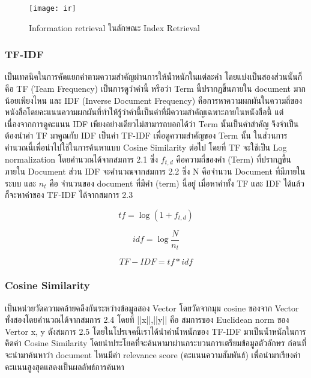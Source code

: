     \begin{figure}[H]
        \centering
        \texttt{[image: ir]}
        \caption{Information retrieval ในลักษณะ Index Retrieval}\label{fig:ir}
    \end{figure}

\subsubsection{TF-IDF}

เป็นเทคนิคในการคัดแยกคำตามความสำคัญผ่านการให้น้ำหนักในแต่ละคำ โดยแบ่งเป็นสองส่วนนั้นก็คือ TF (Team Frequency) เป็นการดูว่าคำนี้ หรือว่า Term นี้ปรากฏขึ้นภายใน document มากน้อยเพียงไหน และ IDF (Inverse  Document Frequency) คือการหาความผกผันในความถี่ของหนังสือโดยคะแนนความผกผันที่ทำให้รู้ว่าคำนี้เป็นคำที่มีความสำคัญเฉพาะภายในหนังสือนี้ แต่เนื่องจากการดูคะแนน IDF เพียงอย่างเดียวไม่สามารถบอกได้ว่า Term นั้นเป็นคำสำคัญ จึงจำเป็นต้องนำค่า TF มาคูณกับ IDF เป็นค่า TF-IDF เพื่อดูความสำคัญของ Term นั้น ในส่วนการคำนวณนี้เพื่อนำไปใช้ในการค้นหาแบบ Cosine Similarity ต่อไป โดยที่ TF จะใช้เป็น Log normalization โดยคำนวณได้จากสมการ 2.1 ซึ่ง $f_{t,d}$ คือความถี่ของคำ (Term) ที่ปรากฏขึ้นภายใน Document ส่วน IDF จะคำนวณจากสมการ 2.2 ซึ่ง N คือจำนวน Document ที่มีภายในระบบ และ $n_{t}$ คือ จำนวนของ document ที่มีคำ (term) นี้อยู่ เมื่อหาค่าทั้ง TF และ IDF ได้แล้วก็จะหาค่าของ TF-IDF ได้จากสมการ 2.3

\begin{equation}
    tf=\log{(1+f_{t,d})}
    \end{equation}

\begin{equation}
    idf=\log{\frac{N}{n_{t}}}
\end{equation}

\begin{equation}
    TF-IDF=tf*idf
    \end{equation}    

\subsubsection{Cosine Similarity}

เป็นหน่วยวัดความคล้ายคลึงกันระหว่างข้อมูลสอง Vector โดยวัดจากมุม cosine ของจาก Vector ทั้งสองโดยคำนวณได้จากสมการ 2.4 โดยที่ ||x||,||y|| คือ สมการของ Euclidean norm ของ Vertor x, y ดังสมการ 2.5 โดยในโปรเจคนี้เราได้นำค่าน้ำหนักของ TF-IDF มาเป็นน้ำหนักในการคิดค่า Cosine Similarity โดยนำประโยคที่จะค้นหามาผ่านกระบวนการเตรียมข้อมูลตัวอักษร ก่อนที่จะนำมาค้นหาว่า document ไหนมีค่า relevance score (คะแนนความสัมพันธ์) เพื่อนำมาเรียงค่าคะแนนสูงสุดแสดงเป็นผลลัพธ์การค้นหา


